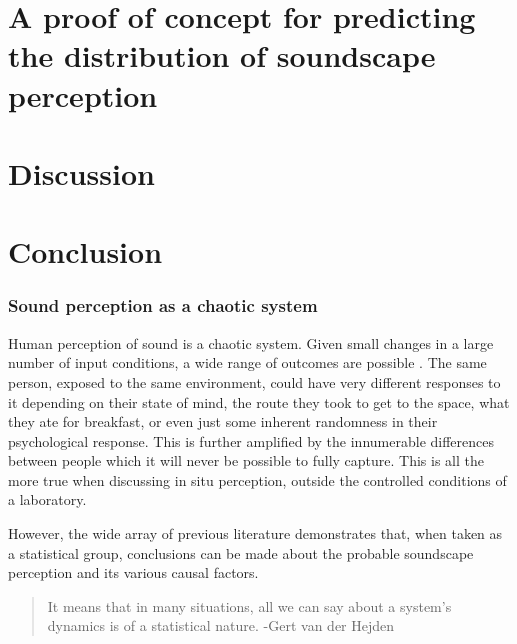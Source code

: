 \section{A proof of concept for predicting the distribution of soundscape perception}

\section{Discussion}

\section{Conclusion}


\subsubsection{Sound perception as a chaotic system}

Human perception of sound is a chaotic system. Given small changes in a large number of input conditions, a wide range of outcomes are possible . The same person, exposed to the same environment, could have very different responses to it depending on their state of mind, the route they took to get to the space, what they ate for breakfast, or even just some inherent randomness in their psychological response. This is further amplified by the innumerable differences between people which it will never be possible to fully capture. This is all the more true when discussing in situ perception, outside the controlled conditions of a laboratory.

However, the wide array of previous literature demonstrates that, when taken as a statistical group, conclusions can be made about the probable soundscape perception and its various causal factors.

\begin{quote}
  It means that in many situations, all we can say about a system's dynamics is of a statistical nature. -Gert van der Hejden
\end{quote}